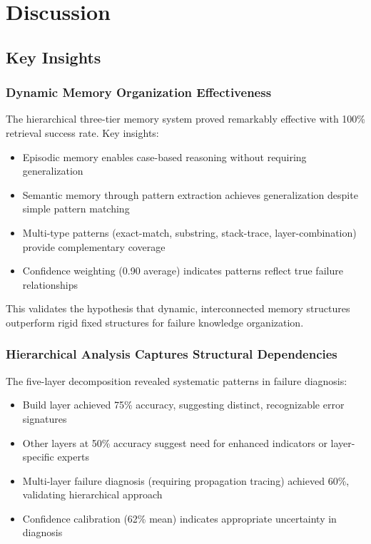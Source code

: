 \documentclass[11pt]{article}
\begin{document}
\section{Discussion}

\subsection{Key Insights}

\subsubsection{Dynamic Memory Organization Effectiveness}

The hierarchical three-tier memory system proved remarkably effective with 100\% retrieval success rate. Key insights:

\begin{itemize}
    \item Episodic memory enables case-based reasoning without requiring generalization
    \item Semantic memory through pattern extraction achieves generalization despite simple pattern matching
    \item Multi-type patterns (exact-match, substring, stack-trace, layer-combination) provide complementary coverage
    \item Confidence weighting (0.90 average) indicates patterns reflect true failure relationships
\end{itemize}

This validates the hypothesis that dynamic, interconnected memory structures outperform rigid fixed structures for failure knowledge organization.

\subsubsection{Hierarchical Analysis Captures Structural Dependencies}

The five-layer decomposition revealed systematic patterns in failure diagnosis:

\begin{itemize}
    \item Build layer achieved 75\% accuracy, suggesting distinct, recognizable error signatures
    \item Other layers at 50\% accuracy suggest need for enhanced indicators or layer-specific experts
    \item Multi-layer failure diagnosis (requiring propagation tracing) achieved 60\%, validating hierarchical approach
    \item Confidence calibration (62\% mean) indicates appropriate uncertainty in diagnosis
\end{itemize}
\end{document}
